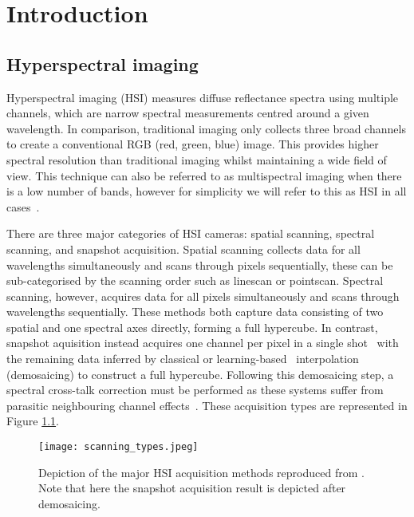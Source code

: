 \chapter{Introduction}
\label{chap:intro}
\minitoc


\section{Hyperspectral imaging}
Hyperspectral imaging (HSI) measures diffuse reflectance spectra using multiple channels, which are narrow spectral measurements centred around a given wavelength. In comparison, traditional imaging only collects three broad channels to create a conventional RGB (red, green, blue) image. This provides higher spectral resolution than traditional imaging whilst maintaining a wide field of view. This technique can also
be referred to as multispectral imaging when there is a low number of bands, however for simplicity we will refer to this as HSI in all cases~\cite{Clancy2020}.

There are three major categories of HSI cameras: spatial scanning, spectral scanning, and snapshot acquisition. Spatial scanning collects data for all wavelengths simultaneously and scans through pixels sequentially, these can be sub-categorised by the scanning order such as linescan or pointscan. Spectral scanning, however, acquires data for all pixels simultaneously and scans through wavelengths sequentially. These methods both capture data consisting of two spatial and one spectral axes directly, forming a full hypercube. In contrast, snapshot aquisition instead acquires one channel per pixel in a single shot~\cite{Geelen2014} with the remaining data inferred by classical or learning-based~\cite{Li2021} interpolation (demosaicing) to construct a full hypercube. Following this demosaicing step, a spectral cross-talk correction must be performed as these systems suffer from parasitic neighbouring channel effects~\cite{Pichette2017}. These acquisition types are represented in Figure \ref{fig:scanning}. 
\begin{figure}[h]
    \centering
    \texttt{[image: scanning\_types.jpeg]}
    \caption{Depiction of the major HSI acquisition methods reproduced from \cite{Araujo-Andrade2021}. Note that here the snapshot acquisition result is depicted after demosaicing.}
    \label{fig:scanning}
\end{figure}

